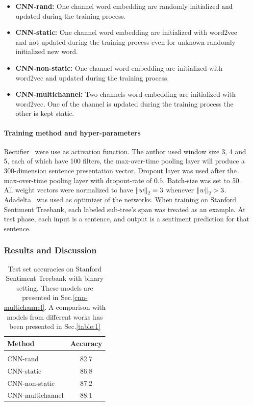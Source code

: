 \begin{itemize}
      \item \textbf{CNN-rand:} One channel word embedding are randomly initialized and updated during the training process.\label{cnn-rand}
    \item \textbf{CNN-static:} One channel word embedding are initialized with word2vec~\cite{word2vec} and not updated during the training process even for unknown randomly initialized new word.\label{cnn-static}
    \item \textbf{CNN-non-static:} One channel word embedding are initialized with word2vec and updated during the training process.\label{cnn-non-static}
    \item \textbf{CNN-multichannel:} Two channels word embedding are initialized with word2vec. One of the channel is updated during the training process the other is kept static.\label{cnn-multichannel}
\end{itemize}
\paragraph{Training method and hyper-parameters} 
Rectifier~\cite{rectifier} were use as activation function.
The author used window size 3, 4 and 5, each of which have 100 filters, the max-over-time pooling layer will produce a 300-dimension sentence presentation vector. 
Dropout layer was used after the max-over-time pooling layer with dropout-rate of \(0.5\).  
Batch-size was set to 50. 
All weight vectors were normalized to have \(\left\lVert w \right\rVert_2 = 3\) whenever \(\left\lVert w \right\rVert_2 > 3\). 
Adadelta~\cite{adadelta} was used as optimizer of the networks.
When training on Stanford Sentiment Treebank, each labeled sub-tree's span was treated as an example.
At test phase, each input is a sentence, and output is a sentiment prediction for that sentence.

\subsubsection{Results and Discussion}\label{kimcnn-drawback}
\begin{table}[H]
\centering
\begin{tabular}{l c} 
 \hline
 \hline 
 Method & Accuracy \\ [0.5ex] 
 \hline
 \hline
 \\  
 CNN-rand & 82.7 \\ 
 CNN-static & 86.8 \\ 
 CNN-non-static & 87.2 \\ 
 CNN-multichannel & 88.1 \\ 
 \hline
 \hline
\end{tabular}
\caption{Test set accuracies on Stanford Sentiment Treebank with binary setting. These models are presented in Sec.\ref{cnn-multichannel}.
A comparison with models from different works has been presented in Sec.\ref{table:1}}
\label{table:KimCNN}
\end{table}

